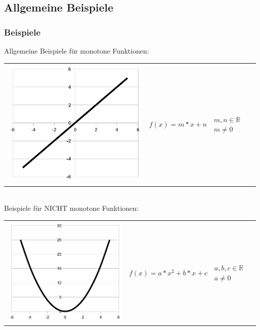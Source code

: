 \documentclass[hyperref={pdfpagelabels=false}]{beamer} %
\begin{document}
  \subsection*{Allgemeine Beispiele}
  \begin{frame}
    \frametitle{Beispiele}
    Allgemeine Beispiele für monotone Funktionen:\\
    \begin{tabular}[t]{lll}
      \includegraphics[scale=0.35]{images/f1.pdf} & $f(x) = m * x + n$ & $m, n \in \mathbb{R}$ $m \neq 0$
    \end{tabular}
    \\Beispiele für NICHT monotone Funktionen:\\
    \begin{tabular}[t]{lll}
      \includegraphics[scale=0.35]{images/f2.pdf} & $f(x) = a * x^2 + b * x + c$ & $a, b, c \in \mathbb{R}$ $a \neq 0$
    \end{tabular}
  \end{frame}
\end{document}
